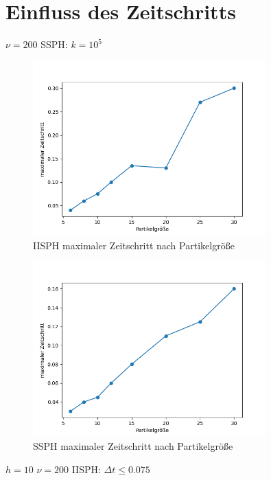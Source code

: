 \documentclass{scrreprt}
\begin{document}
\section{Einfluss des Zeitschritts}
$\nu = 200$
SSPH: $k = 10^5$
\begin{figure}[htb]
    \includegraphics[width=0.8\textwidth]{particle_size_timestep_iisph.png}
    \caption{IISPH maximaler Zeitschritt nach Partikelgröße}
    \label{image:particle_size_timestep_iisph}
\end{figure}

\begin{figure}[htb]
    \includegraphics[width=0.8\textwidth]{particle_size_timestep_ssph.png}
    \caption{SSPH maximaler Zeitschritt nach Partikelgröße}
    \label{image:particle_size_timestep_ssph}
\end{figure}


$h = 10$
$\nu = 200$
IISPH: $\Delta t \leq 0.075$
\end{document}
